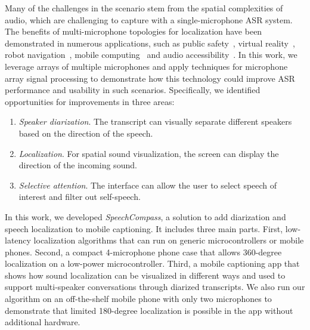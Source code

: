 Many of the challenges in the scenario stem from the spatial complexities of audio, which are challenging to capture with a single-microphone ASR system. The benefits of multi-microphone topologies for localization have been demonstrated in numerous applications, such as public safety~\cite{valenzise2007scream}, virtual reality~\cite{vr_sound_localization}, robot navigation~\cite{liu2010continuous}, mobile computing~\cite{phone_localization, phone_localization2} and audio accessibility~\cite{localization_glasses,holo_sound}.
In this work, we leverage arrays of multiple microphones and apply techniques for microphone array signal processing to demonstrate how this technology could improve ASR performance and usability in such scenarios. Specifically, we identified opportunities for improvements in three areas:
\begin{enumerate}
    \item \textit{Speaker diarization}. The transcript can visually separate different speakers based on the direction of the speech. \item \textit{Localization}. For spatial sound visualization, the screen can display the direction of the incoming sound.
    \item \textit{Selective attention}. The interface can allow the user to select speech of interest and filter out self-speech.
\end{enumerate}




In this work, we developed \textit{SpeechCompass}, a solution to add diarization and speech localization to mobile captioning. It includes three main parts. First, low-latency localization algorithms that can run on generic microcontrollers or mobile phones. Second, a compact 4-microphone phone case that allows 360-degree localization on a low-power microcontroller.  Third, a mobile captioning app that shows how sound localization can be visualized in different ways and used to support multi-speaker conversations through diarized transcripts. We also run our algorithm on an off-the-shelf mobile phone with only two microphones to demonstrate that limited 180-degree localization is possible in the app without additional hardware.

